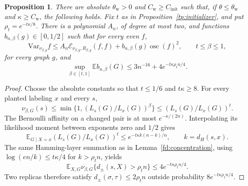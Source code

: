\documentclass[11pt]{article}
\newcommand{\Var}{\mathrm{Var}}
\def\E{\mathbb{E}}
\newtheorem{proposition}[thm]{Proposition}
\numberwithin{equation}{section}
\begin{document}
\begin{proposition}\label{tp:weak}
There are absolute $\theta_{\mathrm w}>0$ and $C_{\mathrm w}\ge C_{\mathrm{init}}$ such that, if $\theta\le\theta_{\mathrm w}$ and $\kappa\ge C_{\mathrm w}$, the following holds. Fix $t$ as in Proposition~\ref{tp:initializer}, and put $\rho_t=e^{-t\kappa/8}$. There is a polynomial $A_n$, of degree at most two, and functions $b_{n,\beta}(g)\in[0,1/2]$ such that for every even $f$,
\[
 \Var_{\nu_{\beta,g}}f\le A_n\mathcal E_{\nu_{\beta,g},R_{\beta,g}}(f,f)
       +b_{n,\beta}(g)\operatorname{osc}(f)^2,
 \qquad t\le\beta\le1,
\]
for every graph $g$, and
\[
 \sup_{\beta\in[t,1]}\E b_{n,\beta}(G)
 \le3n^{-16}+4e^{-t\kappa\rho_t n/4}.
\]
\end{proposition}
\begin{proof}
Choose the absolute constants so that $t\le1/6$ and $t\kappa\ge8$. For every planted labeling $x$ and every $s$,
\[
 \nu_{\beta,G}(s)\le\min\{1,(L_s(G)/L_x(G))^\beta\}
       \le(L_s(G)/L_x(G))^t.
\]
The Bernoulli affinity on a changed pair is at most $e^{-\kappa/(2n)}$. Interpolating its likelihood moment between exponents zero and $1/2$ gives
\[
 \E_{G\mid X=x}(L_s(G)/L_x(G))^t
 \le e^{-t\kappa k(n-k)/n},\qquad k=d_H(s,x).
\]
The same Hamming-layer summation as in Lemma~\ref{fd:concentration}, using
$\log(en/k)\le t\kappa/4$ for $k>\rho_tn$, yields
\begin{equation}\label{tp:overlap}
 \E_{X,G}\nu_{\beta,G}\{d_\pm(s,X)>\rho_tn\}
 \le4e^{-t\kappa\rho_tn/4}.
\end{equation}
Two replicas therefore satisfy $d_\pm(\sigma,\tau)\le2\rho_tn$ outside probability $8e^{-t\kappa\rho_tn/4}$.


\end{proof}
\end{document}
